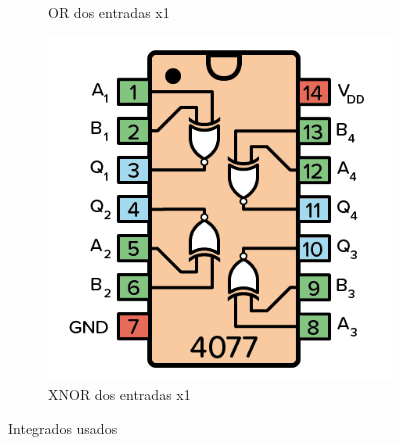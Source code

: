 \begin{center}
\begin{figure}[h!]
\begin{subfigure}[d]{0.45\linewidth}
\caption{OR dos entradas x1}
\end{subfigure}
\begin{subfigure}[d]{0.45\linewidth}
\includegraphics[width=\linewidth]{./imagenes/cd4077.png}
\caption{XNOR dos entradas x1}
\end{subfigure}

\caption{Integrados usados}
\end{figure}
\end{center}

\thispagestyle{fancy}

\inicioCodigo{}
